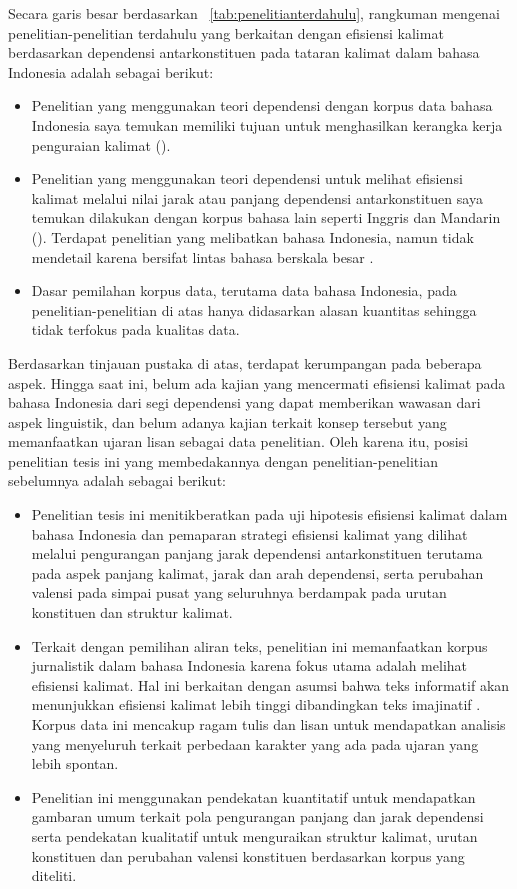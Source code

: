 Secara garis besar berdasarkan \tab~\ref{tab:penelitianterdahulu}, rangkuman mengenai penelitian-penelitian terdahulu yang berkaitan dengan efisiensi kalimat berdasarkan dependensi antarkonstituen pada tataran kalimat dalam bahasa Indonesia adalah sebagai berikut:
\begin{itemize}
\item Penelitian yang menggunakan teori dependensi dengan korpus data bahasa Indonesia saya temukan memiliki tujuan untuk menghasilkan kerangka kerja penguraian kalimat (\citealp{kamayani2011dependency, green2012indonesian, irmawati2015dependency}).
\item Penelitian yang menggunakan teori dependensi untuk melihat efisiensi kalimat melalui nilai jarak atau panjang dependensi antarkonstituen saya temukan dilakukan dengan korpus bahasa lain seperti Inggris dan Mandarin (\citealp{jiang2015effects, wang2017effects}). Terdapat penelitian yang melibatkan bahasa Indonesia, namun tidak mendetail karena bersifat lintas bahasa berskala besar \citep{futrell2015large}.
\item Dasar pemilahan korpus data, terutama data bahasa Indonesia, pada penelitian-penelitian di atas hanya didasarkan alasan kuantitas sehingga tidak terfokus pada kualitas data. 
\end{itemize}
Berdasarkan tinjauan pustaka di atas, terdapat kerumpangan pada beberapa aspek. Hingga saat ini, belum ada kajian yang mencermati efisiensi kalimat pada bahasa Indonesia dari segi dependensi yang dapat memberikan wawasan dari aspek linguistik, dan belum adanya kajian terkait konsep tersebut yang memanfaatkan ujaran lisan sebagai data penelitian. Oleh karena itu, posisi penelitian tesis ini yang membedakannya dengan penelitian-penelitian sebelumnya adalah sebagai berikut:
\begin{itemize}
\item Penelitian tesis ini menitikberatkan pada uji hipotesis efisiensi kalimat dalam bahasa Indonesia dan pemaparan strategi efisiensi kalimat yang dilihat melalui pengurangan panjang jarak dependensi antarkonstituen terutama pada aspek panjang kalimat, jarak dan arah dependensi, serta perubahan \gls{valensi} pada simpai pusat yang seluruhnya berdampak pada urutan konstituen dan struktur kalimat.
\item Terkait dengan pemilihan aliran teks, penelitian ini memanfaatkan korpus jurnalistik dalam bahasa Indonesia karena fokus utama adalah melihat efisiensi kalimat. Hal ini berkaitan dengan asumsi bahwa teks informatif akan menunjukkan efisiensi kalimat lebih tinggi dibandingkan teks imajinatif \citep{wang2017effects}. Korpus data ini mencakup ragam tulis dan lisan untuk mendapatkan analisis yang menyeluruh terkait perbedaan karakter yang ada pada ujaran yang lebih spontan.
\item Penelitian ini menggunakan pendekatan kuantitatif untuk mendapatkan gambaran umum terkait pola pengurangan panjang dan jarak dependensi serta pendekatan kualitatif untuk menguraikan struktur kalimat, urutan konstituen dan perubahan valensi konstituen berdasarkan korpus yang diteliti.
\end{itemize}

